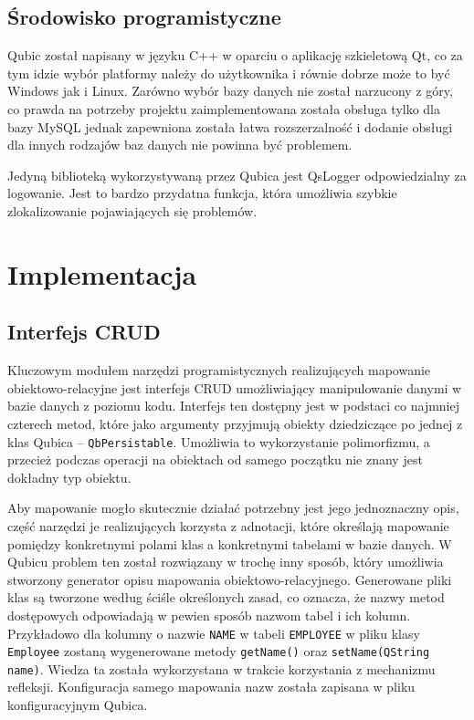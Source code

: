 \documentclass[12pt]{report}
\begin{document}
\subsection{Środowisko programistyczne}

Qubic został napisany w języku C++ w oparciu o aplikację szkieletową Qt, co za tym idzie wybór platformy należy do użytkownika i równie dobrze może to być Windows jak i Linux.
Zarówno wybór bazy danych nie został narzucony z góry, co prawda na potrzeby projektu zaimplementowana została obsługa tylko dla bazy MySQL jednak zapewniona została 
łatwa rozszerzalność i dodanie obsługi dla innych rodzajów baz danych nie powinna być problemem.

Jedyną biblioteką wykorzystywaną przez Qubica jest QsLogger odpowiedzialny za logowanie. Jest to bardzo przydatna funkcja, która umożliwia szybkie zlokalizowanie pojawiających
się problemów.

\section{Implementacja}

\subsection{Interfejs CRUD}

Kluczowym modułem narzędzi programistycznych realizujących mapowanie obiekt\-owo-relacyjne jest interfejs CRUD umożliwiający manipulowanie danymi w bazie danych z 
poziomu kodu. Interfejs ten dostępny jest w podstaci co najmniej czterech metod, które jako argumenty przyjmują obiekty dziedziczące po jednej z klas Qubica -- 
{\tt QbPersistable}. Umożliwia to wykorzystanie polimorfizmu, a przecież podczas operacji na obiektach od samego początku nie znany jest dokładny typ obiektu.

Aby mapowanie mogło skutecznie działać potrzebny jest jego jednoznaczny opis, część narzędzi je realizujących korzysta z adnotacji, które określają mapowanie pomiędzy
konkretnymi polami klas a konkretnymi tabelami w bazie danych. W Qubicu problem ten został rozwiązany w trochę inny sposób, który umożliwia stworzony generator opisu
mapowania obiektowo-relacyjnego. Generowane pliki klas są tworzone według ściśle określonych zasad, co oznacza, że nazwy metod dostępowych odpowiadają w pewien
sposób nazwom tabel i ich kolumn. Przykładowo dla kolumny o nazwie {\tt NAME} w tabeli {\tt EMPLOYEE} w pliku klasy {\tt Employee} zostaną wygenerowane metody 
{\tt getName()} oraz {\tt setName(QString name)}. Wie\-dza ta została wykorzystana w trakcie korzystania z mechanizmu refleksji. Konfiguracja samego mapowania nazw
została zapisana w pliku konfiguracyjnym Qubica.
\end{document}
